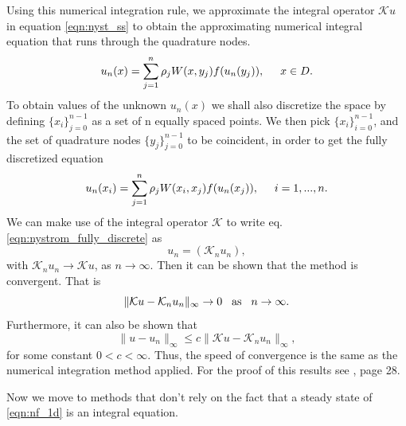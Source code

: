 \documentclass{uonmathreport}
\begin{document}
Using this numerical integration rule, we approximate the integral operator $\mathcal{K}u$ in equation \ref{eqn:nyst_ss} to obtain the approximating numerical integral equation that runs through the quadrature nodes.
\begin{equation}
u_n(x) = \sum_{j=1}^{n} \rho_j W(x, y_j)f(u_n(y_j)), \hspace{5mm} x \in D.
\end{equation}
To obtain values of the unknown $u_n(x)$ we shall also discretize the space by defining $\{x_i\}_{j=0}^{n-1}$ as a set of n equally spaced points. We then pick $\{x_i\}_{i=0}^{n-1}$, and the set of quadrature nodes $\{y_j\}_{j=0}^{n-1}$ to be coincident, in order to get the fully discretized equation
\begin{equation} \label{eqn:nystrom_fully_discrete}
u_n(x_i) = \sum_{j=1}^{n} \rho_j W(x_i, x_j)f(u_n(x_j)), \hspace{5mm} i=1,...,n.
\end{equation}
We can make use of the integral operator $\mathcal{K}$ to write eq. \ref{eqn:nystrom_fully_discrete} as
\begin{equation}
	u_n = (\mathcal{K}_nu_n),
\end{equation}
with $\mathcal{K}_nu_n \rightarrow \mathcal{K}u$, as $n \rightarrow \infty$. Then it can be shown that the method is convergent. That is
\begin{equation}
	\| \mathcal{K}u - \mathcal{K}_nu_n \|_{\infty} \rightarrow 0 \hspace{3mm} \textnormal{as} \hspace{3mm} n \rightarrow \infty.
\end{equation}
Furthermore, it can also be shown that
\begin{equation}
	\| u - u_n \|_{\infty} \leq c\|\mathcal{K}u - \mathcal{K}_nu_n \|_{\infty},
\end{equation}
for some constant $0<c<\infty$. Thus, the speed of convergence is the same as the numerical integration method applied. For the proof of this results see \cite{atkinson1992survey}, page 28.

Now we move to methods that don't rely on the fact that a steady state of \ref{eqn:nf_1d} is an integral equation.
\end{document}
